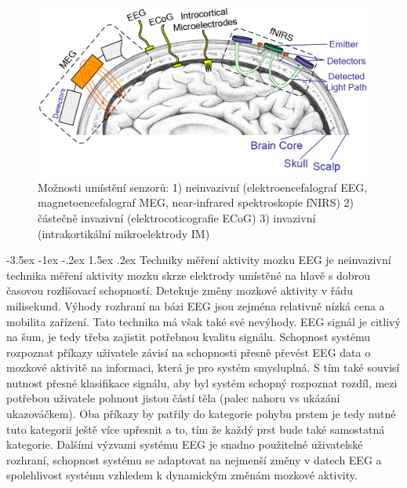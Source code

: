 \documentclass[a4paper,10pt]{article}
\makeatletter
\theoremstyle{definition}
\renewcommand\section{\@startsection {section}{1}{\z@}%
                                   {-3.5ex \@plus -1ex \@minus -.2ex}%
                                   {1.5ex \@plus.2ex}%
                                   {\large\bfseries}}
\makeatother
\begin{document}
\begin{figure}[h]
\begin{center}
\includegraphics[scale=0.55]{image/umistenisenzorunahlave.PNG}
\caption{Možnosti umístění senzorů: 1) neinvazivní (elektroencefalograf EEG, magnetoencefalograf MEG, near-infrared spektroskopie fNIRS) 2) částečně invazivní (elektrocoticografie ECoG) 3) invazivní (intrakortikální mikroelektrody IM) \cite{s23136001obrazekmozkusesenzory}}
\label{fig:1}
\end{center}
\end{figure}


\section{Techniky měření aktivity mozku}
\label{sec:2}
EEG je neinvazivní technika měření aktivity mozku skrze elektrody umístěné na hlavě s dobrou časovou rozlišovací schopností. Detekuje změny mozkové aktivity v řádu milisekund. Výhody rozhraní na bázi EEG jsou zejména relativně nízká cena a mobilita zařízení. Tato technika má však také své nevýhody. EEG signál je citlivý na šum, je tedy třeba zajistit potřebnou kvalitu signálu. Schopnost systému rozpoznat příkazy uživatele závisí na schopnosti přesně převést EEG data o mozkové aktivitě na informaci, která je pro systém smysluplná. S tím také souvisí nutnost přesné klasifikace signálu, aby byl systém schopný rozpoznat rozdíl, mezi potřebou uživatele pohnout jistou částí těla (palec nahoru vs ukázání ukazováčkem). Oba příkazy by patřily do kategorie pohybu prstem je tedy nutné tuto kategorii ještě více upřesnit a to, tím že každý prst bude také samostatná kategorie. Dalšími výzvami systému EEG je snadno použitelné uživatelské rozhraní, schopnost systému se adaptovat na nejmenší změny v datech EEG a spolehlivost systému vzhledem k dynamickým změnám mozkové aktivity.\cite{AI2023obrazovky, article, athanasiou2017rehabilitation, article3, s23136001obrazekmozkusesenzory}
\end{document}
